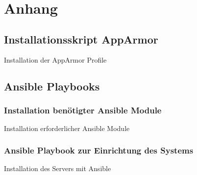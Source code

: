 \section{Anhang}

\subsection{Installationsskript AppArmor}

\begin{listing}[ht]{}
    \caption{Installation der AppArmor Profile}
    \label{listing:installation_apparmor}
\end{listing}

\subsection{Ansible Playbooks}

\subsubsection{Installation benötigter Ansible Module}
\begin{listing}
    \caption{Installation erforderlicher Ansible Module}
    \label{listing:ansible_module_installation}
\end{listing}


\subsubsection{Ansible Playbook zur Einrichtung des Systems}
\begin{longlisting}
    \caption{Installation des Servers mit Ansible}
    \label{listing:ansible_playbook}
\end{longlisting}


